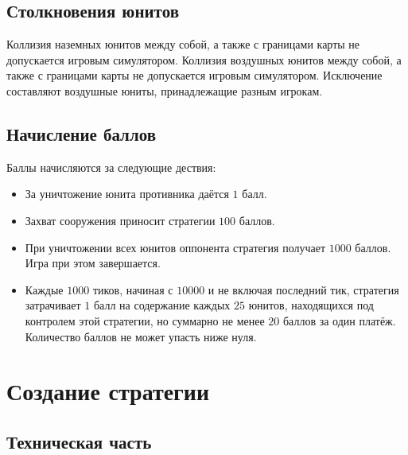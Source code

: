 \section{Столкновения юнитов}

Коллизия наземных юнитов между собой, а также с границами карты не допускается игровым симулятором. Коллизия воздушных юнитов между собой, а
также с границами карты не допускается игровым симулятором. Исключение составляют воздушные юниты, принадлежащие разным игрокам.

\section{Начисление баллов}

Баллы начисляются за следующие дествия:
\begin{itemize}
    \item За уничтожение юнита противника даётся $1$ балл.
    \item Захват сооружения приносит стратегии $100$ баллов.
    \item При уничтожении всех юнитов оппонента стратегия получает $1000$ баллов. Игра при этом завершается.
    \item Каждые $1000$ тиков, начиная с $10000$ и не включая последний тик, стратегия затрачивает $1$ балл на содержание каждых $25$
          юнитов, находящихся под контролем этой стратегии, но суммарно не менее $20$ баллов за один платёж. Количество баллов не может
          упасть ниже нуля.
\end{itemize}

\chapter{Создание стратегии}

\section{Техническая часть}

